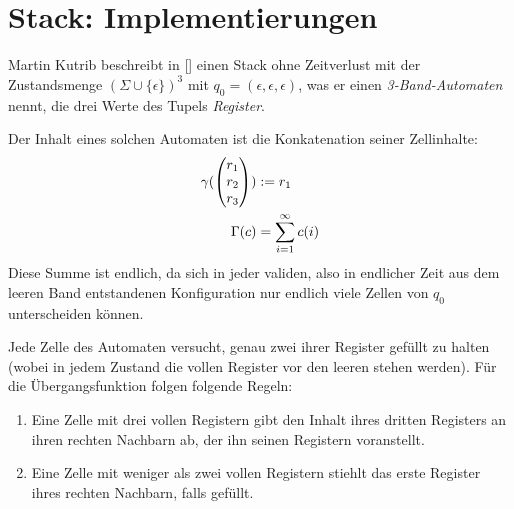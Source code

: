 \documentclass{article}
\begin{document}
\section{Stack: Implementierungen}

Martin Kutrib beschreibt in [] einen Stack ohne Zeitverlust mit der Zustandsmenge $(\Sigma \cup \{\epsilon\})^3$ mit $q_0 = (\epsilon,\epsilon,\epsilon)$, was er einen \emph{3-Band-Automaten} nennt, die drei Werte des Tupels \emph{Register}.

Der Inhalt eines solchen Automaten ist die Konkatenation seiner Zellinhalte:
\begin{align*}
    \gamma(\begin{pmatrix}r_1\\r_2\\r_3\end{pmatrix}) &:= r_1 \\
\Gamma(c) &= \sum^\infty_{i=1} c(i)
\end{align*}
Diese Summe ist endlich, da sich in jeder validen, also in endlicher Zeit aus dem leeren Band entstandenen Konfiguration nur endlich viele Zellen von $q_0$ unterscheiden können.

Jede Zelle des Automaten versucht, genau zwei ihrer Register gefüllt zu halten (wobei in jedem Zustand die vollen Register vor den leeren stehen werden). Für die Übergangsfunktion folgen folgende Regeln:
\begin{enumerate}
    \item Eine Zelle mit drei vollen Registern gibt den Inhalt ihres dritten Registers an ihren rechten Nachbarn ab, der ihn seinen Registern voranstellt.
        \begin{center}
        \end{center}
    \item Eine Zelle mit weniger als zwei vollen Registern stiehlt das erste Register ihres rechten Nachbarn, falls gefüllt.
        \begin{center}
        \end{center}
\end{enumerate}
\end{document}
